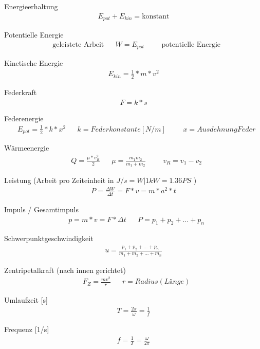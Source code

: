 \documentclass[17pt]{extarticle}
\begin{document}
	Energieerhaltung
	\begin{align}
		E_{pot} + E_{kin} = \text{konstant}
	\end{align}
	
	Potentielle Energie
	\begin{align}
		&\text{geleistete Arbeit} 
		&&W = E_{pot} 
		&&&\text{potentielle Energie}
	\end{align}
	
	Kinetische Energie
	\begin{align}
		E_{kin} = \frac{1}{2} * m * v^{2}
	\end{align}
	
	Federkraft
	\begin{align}
		F = k * s
	\end{align}
	
	Federenergie
	\begin{align}
		&E_{pot} = \frac{1}{2} * k * x^{2}
		&&k = Federkonstante [N/m]
		&&&x = Ausdehnung Feder
	\end{align}
	
	Wärmeenergie
	\begin{align}
		&Q = \frac{\mu * v_R^2}{2}
		&&\mu = \frac{m_1 m_2}{m_1 + m_2}
		&&&v_R = v_1 - v_2
	\end{align}
	
	Leistung \small(Arbeit pro Zeiteinheit in $J/s = W | 1kW = 1.36 PS$ )
	\begin{align}
		P = \frac{\Delta W}{\Delta t} = F * v = m * a^{2} * t
	\end{align}
	
	Impuls / Gesamtimpuls
	\begin{align}
		&p = m * v = F * \Delta t
		&&P = p_{1} + p_{2} + ... + p_{n}
	\end{align}
	
	Schwerpunktgeschwindigkeit
	\begin{align}
		u = \frac{p_{1} + p_{2} + ... + p_{n}}{m_{1} + m_{2} + ... + m_{n}}
	\end{align}
	
	Zentripetalkraft (nach innen gerichtet)
	\begin{align}
		&F_Z = \frac{m v^2}{r}
		&& r = Radius (Länge)
	\end{align}
	
	Umlaufzeit [s]
	\begin{align}
		T = \frac{2 \pi}{\omega}  = \frac{1}{f}
	\end{align}
	
	Frequenz [1/s]
	\begin{align}
		f = \frac{1}{T} = \frac{\omega}{2 \pi}
	\end{align}
	
\end{document}
